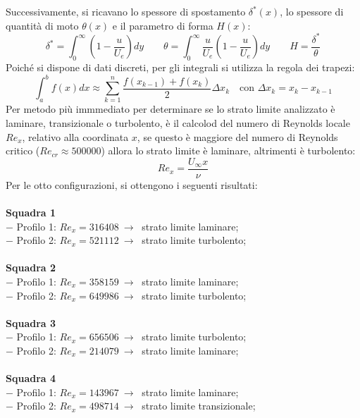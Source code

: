 \noindent Successivamente, si ricavano lo spessore di spostamento $\delta^*(x)$, lo spessore di quantità di moto $\theta(x)$ e il parametro di forma $H(x)$:
\begin{equation*}
    \delta^* = \int_0^\infty \left(1-\frac{u}{U_e}\right)dy \qquad \theta = \int_0^\infty \frac{u}{U_e}\left(1-\frac{u}{U_e}\right)dy \qquad H = \frac{\delta^*}{\theta}
\end{equation*}
Poiché si dispone di dati discreti, per gli integrali si utilizza la regola dei trapezi:
\begin{equation*}
    \int_a^b f(x)dx \approx \sum_{k=1}^n \frac{f(x_{k-1}) + f(x_k)}2 \Delta x_k \quad \text{con } \Delta x_k = x_k - x_{k-1}
\end{equation*}
Per metodo più immmediato per determinare se lo strato limite analizzato è laminare, transizionale o turbolento, è il calcolod del numero di Reynolds locale $Re_x$, relativo alla coordinata $x$, se questo è maggiore del numero di Reynolds critico ($Re_{cr}\approx500000$) allora lo strato limite è laminare, altrimenti è turbolento:
\begin{equation*}
    Re_x = \frac{U_\infty x}\nu
\end{equation*}
Per le otto configurazioni, si ottengono i seguenti risultati:\\\\
\textbf{Squadra 1}\\
$-$ Profilo 1: $Re_x=316408\ \rightarrow\ $ strato limite laminare;\\
$-$ Profilo 2: $Re_x=521112\ \rightarrow\ $ strato limite turbolento;\\\\
\textbf{Squadra 2}\\
$-$ Profilo 1: $Re_x=358159\ \rightarrow\ $ strato limite laminare;\\
$-$ Profilo 2: $Re_x=649986\ \rightarrow\ $ strato limite turbolento;\\\\
\textbf{Squadra 3}\\
$-$ Profilo 1: $Re_x=656506\ \rightarrow\ $ strato limite turbolento;\\
$-$ Profilo 2: $Re_x=214079\ \rightarrow\ $ strato limite laminare;\\\\
\textbf{Squadra 4}\\
$-$ Profilo 1: $Re_x=143967\ \rightarrow\ $ strato limite laminare;\\
$-$ Profilo 2: $Re_x=498714\ \rightarrow\ $ strato limite transizionale;\\\\
